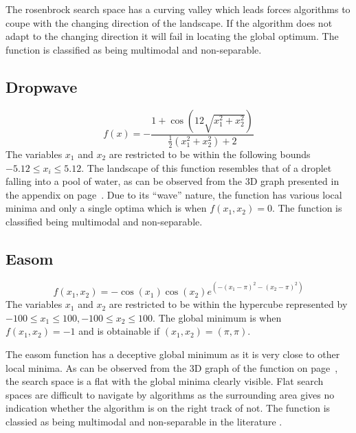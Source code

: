 The rosenbrock search space has a curving valley which leads forces algorithms to coupe with the changing direction of the landscape\cite{numericalABC,ABCCompareStudy,ChaoticABC,PerfABC,HybridIntelliGA}. If the algorithm does not adapt to the changing direction it will fail in locating the global optimum. The function is classified as being multimodal and non-separable\cite{numericalABC,ABCCompareStudy,ChaoticABC,PerfABC,HybridIntelliGA}.
\subsection{Dropwave}
\begin{equation}
	f(x) = -\frac{1 + \cos{(12\sqrt{x_1^2 + x_2^2})}}{\frac{1}{2}(x_1^2 + x_2^2) + 2}
\end{equation}
The variables $x_1$ and $x_2$ are restricted to be within the following bounds $-5.12 \leq x_i \leq 5.12$\cite{TestFunctions}. The landscape of this function resembles that of a droplet falling into a pool of water, as can be observed from the 3D graph presented in the appendix on page~\pageref{fig:DropwaveGraph}. Due to its ``wave'' nature, the function has various local minima and only a single optima which is when $f(x_1,x_2) = 0$. The function is classified being multimodal and non-separable\cite{TestFunctions}.
\subsection{Easom}
\begin{equation}
	f(x_1,x_2) = -\cos(x_1)\cos(x_2)e^{(-(x_1 - \pi)^2 - (x_2 - \pi)^2)}
\end{equation}
The variables $x_1$ and $x_2$ are restricted to be within the hypercube represented by $-100 \leq x_1 \leq 100, -100 \leq x_2 \leq 100$\cite{TSGlobalOptContinFunc,ContinACSTS,TestFunctions}. The global minimum is when $f(x_1,x_2) = -1$ and is obtainable if $(x_1,x_2) = (\pi,\pi)$\cite{TSGlobalOptContinFunc,ContinACSTS,TestFunctions}. 

The easom function has a deceptive global minimum as it is very close to other local minima\cite{ABCCompareStudy,TSGlobalOptimization}. As can be observed from the 3D graph of the function on page~\pageref{fig:EasomGraph}, the search space is a flat with the global minima clearly visible. Flat search spaces are difficult to navigate by algorithms as the surrounding area gives no indication whether the algorithm is on the right track of not. The function is classied as being multimodal and non-separable in the literature \cite{ABCCompareStudy,TSGlobalOptimization,TSGlobalOptContinFunc}.
